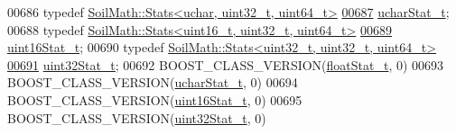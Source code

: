 \begin{DoxyCode}
00686 \textcolor{keyword}{typedef} \hyperlink{class_soil_math_1_1_stats}{SoilMath::Stats<uchar, uint32\_t, uint64\_t>}
\hypertarget{_stats_8h_source_l00687}{}\hyperlink{_stats_8h_a5b876b087ada3df30b8dd6309fc25191}{00687}     \hyperlink{_stats_8h_a5b876b087ada3df30b8dd6309fc25191}{ucharStat\_t}; 
00688 \textcolor{keyword}{typedef} \hyperlink{class_soil_math_1_1_stats}{SoilMath::Stats<uint16\_t, uint32\_t, uint64\_t>}
\hypertarget{_stats_8h_source_l00689}{}\hyperlink{_stats_8h_a78f1b1fd7cec859f1d5597f89b27df68}{00689}     \hyperlink{_stats_8h_a78f1b1fd7cec859f1d5597f89b27df68}{uint16Stat\_t}; 
00690 \textcolor{keyword}{typedef} \hyperlink{class_soil_math_1_1_stats}{SoilMath::Stats<uint32\_t, uint32\_t, uint64\_t>}
\hypertarget{_stats_8h_source_l00691}{}\hyperlink{_stats_8h_a7c49bb4faf7ca4792e46c1b756c07b20}{00691}     \hyperlink{_stats_8h_a7c49bb4faf7ca4792e46c1b756c07b20}{uint32Stat\_t}; 
00692 BOOST\_CLASS\_VERSION(\hyperlink{class_soil_math_1_1_stats}{floatStat\_t}, 0)
00693 BOOST\_CLASS\_VERSION(\hyperlink{class_soil_math_1_1_stats}{ucharStat\_t}, 0)
00694 BOOST\_CLASS\_VERSION(\hyperlink{class_soil_math_1_1_stats}{uint16Stat\_t}, 0)
00695 BOOST\_CLASS\_VERSION(\hyperlink{class_soil_math_1_1_stats}{uint32Stat\_t}, 0)
\end{DoxyCode}
